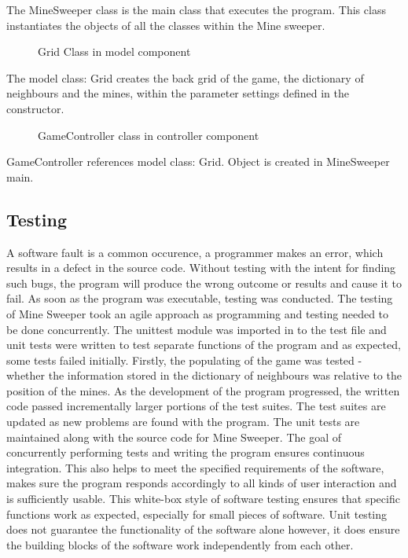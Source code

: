 \documentclass[12pt, a4]{report}
\begin{document}
\par The MineSweeper class is the main class that executes the program. This class instantiates the objects of all the classes within the Mine sweeper. 
\pagebreak
	\begin{figure}[h]
	
	\caption{Grid Class in model component}
\end{figure}
	\par The model class: Grid creates the back grid of the game, the dictionary of neighbours and the mines, within the parameter settings defined in the constructor.  
	
	\begin{figure}[h]
	
	\caption{GameController class in controller component}
\end{figure}
	\par GameController references model class: Grid. Object is created in MineSweeper main.
	
	\subsection{Testing}
	\par A software fault is a common occurence, a programmer makes an error, which results in a defect in the source code. Without testing with the intent for finding such  bugs, the program will produce the wrong outcome or results and cause it to fail. As soon as the program was executable, testing was conducted. The testing of Mine Sweeper took an agile approach as programming and testing needed to be done concurrently. The unittest module was imported in to the test file and unit tests were written to test separate functions of the program and as expected, some tests failed initially. Firstly, the populating of the game was tested - whether the information stored in the dictionary of neighbours was relative to the position of the mines. As the development of the program progressed, the written code passed incrementally larger portions of the test suites. The test suites are updated as new problems are found with the program. The unit tests are maintained along with the source code for Mine Sweeper. The goal of concurrently performing tests and writing the program ensures continuous integration. This also helps to meet the specified requirements of the software, makes sure the program responds accordingly to all kinds of user interaction and is sufficiently usable. This white-box style of software testing ensures that specific functions work as expected, especially for small pieces of software. Unit testing does not guarantee the functionality of the software alone however, it does ensure the building blocks of the software work independently from each other.
	
\end{document}
